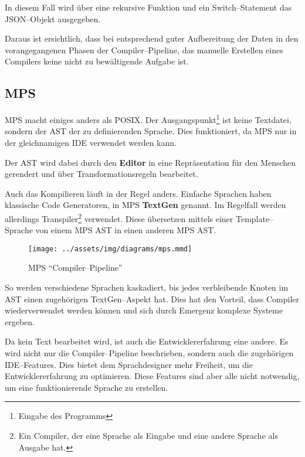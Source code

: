 In diesem Fall wird über eine rekursive Funktion und ein Switch--Statement das \acs{JSON}--Objekt ausgegeben.

Daraus ist ersichtlich, dass bei entsprechend guter Aufbereitung der Daten in den vorangegangenen Phasen der Compiler--Pipeline, das manuelle Erstellen eines Compilers keine nicht zu bewältigende Aufgabe ist.

\subsection{\acl{MPS}}\label{subsec:meta-programming-system}
\ac{MPS} macht einiges anders als \ac{POSIX}.
Der Ausgangspunkt\footnote{Eingabe des Programms} ist keine Textdatei, sondern der \ac{AST} der zu definierenden Sprache.
Dies funktioniert, da \ac{MPS} nur in der gleichnamigen \ac{IDE} verwendet werden kann.

Der \ac{AST} wird dabei durch den \textbf{Editor} in eine Repräsentation für den Menschen gerendert und über Transformationsregeln bearbeitet.

Auch das Kompilieren läuft in der Regel anders.
Einfache Sprachen haben klassische Code Generatoren, in \ac{MPS} \textbf{TextGen} genannt.
Im Regelfall werden allerdings Transpiler\footnote{Ein Compiler, der eine Sprache als Eingabe und eine andere Sprache als Ausgabe hat.} verwendet.
Diese übersetzen mittels einer Template--Sprache von einem \ac{MPS} \ac{AST} in einen anderen \ac{MPS} \ac{AST}.

\begin{wrapfigure}{lH}{0.5\textwidth}
    \begin{center}
        \texttt{[image: ../assets/img/diagrams/mps.mmd]}
    \end{center}
    \caption{\acs{MPS} \enquote{Compiler--Pipeline}}
    \label{fig:mps-compiler-pipeline}
\end{wrapfigure}

So werden verschiedene Sprachen kaskadiert, bis jedes verbleibende Knoten im \ac{AST} einen zugehörigen TextGen--Aspekt hat.
Dies hat den Vorteil, dass Compiler wiederverwendet werden können und sich durch Emergenz komplexe Systeme ergeben.

Da kein Text bearbeitet wird, ist auch die Entwicklererfahrung eine andere.
Es wird nicht nur die Compiler--Pipeline beschrieben, sondern auch die zugehörigen \acs{IDE}--Features.
Dies bietet dem Sprachdesigner mehr Freiheit, um die Entwicklererfahrung zu optimieren.
Diese Features sind aber alle nicht notwendig, um eine funktionierende Sprache zu erstellen.

